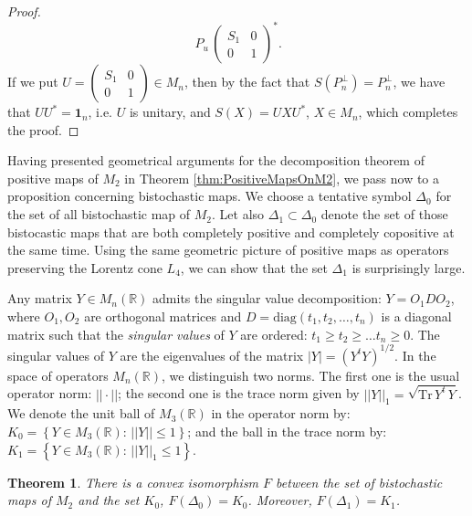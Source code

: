 \documentclass[12pt]{article}
\theoremstyle{plain}
\newtheorem{theorem}{Theorem}
\theoremstyle{definition}
\theoremstyle{remark}
\numberwithin{equation}{section}
\begin{document}
\begin{proof}
\begin{equation}
    \, P_{u} \,
    \begin{pmatrix}
    S_{1} & 0 \\ 0 & 1
    \end{pmatrix}^{*}.
\end{equation}
If we put $U = \left( \begin{smallmatrix} S_{1} & 0 \\ 0 & 1 \end{smallmatrix} \right) \in M_{n}$,
then by the fact that $S(P_{n}^{\perp}) = P_{n}^{\perp}$,
we have that $U U^{*} = \mathbf{1}_{n}$, i.e. $U$ is unitary,
and $S(X) = U X U^{*}$, $X \in M_{n}$, which completes the proof.
\end{proof}

Having presented geometrical arguments for the decomposition theorem
of positive maps of $M_{2}$ in Theorem \ref{thm:PositiveMapsOnM2},
we pass now to a proposition concerning bistochastic maps.
We choose a tentative symbol $\Delta_{0}$ for the set of all bistochastic map of $M_{2}$.
Let also $\Delta_{1} \subset \Delta_{0}$ denote the set of those bistocastic maps
that are both completely positive and completely copositive at the same time.
Using the same geometric picture of positive maps as operators
preserving the Lorentz cone $L_{4}$,
we can show that the set $\Delta_{1}$ is surprisingly large.

Any matrix $Y \in M_{n}(\mathbb{R})$ admits the singular value decomposition:
$Y = O_{1} D O_{2}$, where
$O_{1}, O_{2}$ are orthogonal matrices
and $D = \text{diag}(t_{1}, t_{2}, \ldots, t_{n})$ is a diagonal matrix
such that the \emph{singular values} of $Y$ are ordered:
$t_{1} \geq t_{2} \geq \ldots t_{n} \geq 0$.
The singular values of $Y$ are the eigenvalues of the matrix
$|Y| = (Y^{t} Y)^{1/2}$.
In the space of operators $M_{n}(\mathbb{R})$,
we distinguish two norms.
The first one is the usual operator norm: $|| \cdot ||$;
the second one is the trace norm given by
$||Y||_{1} = \sqrt{\text{Tr} \, Y^{t} \, Y }$.
We denote the unit ball of $M_{3}(\mathbb{R})$ in the operator norm by:
$K_{0} = \left \{ Y \in M_{3}(\mathbb{R}): \, ||Y|| \leq 1 \right \}$;
and the ball in the trace norm by:
$K_{1} = \left \{ Y \in M_{3}(\mathbb{R}): \, ||Y||_{1} \leq 1 \right \}$.
 

\begin{theorem}
\label{thm:Ball}
There is a convex isomorphism $F$ between the set of bistochastic maps of $M_{2}$
and the set $K_{0}$, $F(\Delta_{0}) = K_{0}$. 
Moreover, $F(\Delta_{1}) = K_{1}$.    
\end{theorem}
\end{document}
